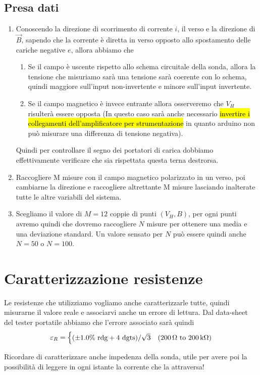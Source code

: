 \documentclass[fleqn,varvw,preprintnumbers,citeautoscript]{memo}
\begin{document}
\subsection{Presa dati}
\begin{enumerate}
    \item Conoscendo la direzione di scorrimento di corrente $i$, il verso e la direzione di $\vec{B}$, sapendo che la corrente è diretta in verso opposto allo spostamento delle cariche negative $e$, allora abbiamo che \begin{enumerate}
        \item Se il campo è uscente rispetto allo schema circuitale della sonda, allora la tensione che misuriamo sarà una tensione sarà coerente con lo schema, quindi maggiore sull'input non-invertente e minore sull'input invertente. 
        \item Se il campo magnetico è invece entrante allora osserveremo che $V_H$ risulterà essere opposta (In questo caso sarà anche necessario \hl{invertire i collegamenti dell'amplificatore per strumentazione} in quanto arduino non può misurare una differenza di tensione negativa). 
    \end{enumerate}
    Quindi per controllare il segno dei portatori di carica dobbiamo effettivamente verificare che sia rispettata questa terna destrorsa. 
    \item Raccogliere M misure con il campo magnetico polarizzato in un verso, poi cambiarne la direzione e raccogliere altrettante M misure lasciando inalterate tutte le altre variabili del sistema. 
    \item Scegliamo il valore di $M=12$ coppie di punti $(V_H,B)$, per ogni punti avremo quindi che dovremo raccogliere $N$ misure per ottenere una media e una deviazione standard. Un valore sensato per $N$ può essere quindi anche $N=50$ o $N=100$. 
\end{enumerate}

\appendix

\section{Caratterizzazione resistenze}

Le resistenze che utilizziamo vogliamo anche caratterizzarle tutte, quindi misurarne il valore reale e associarvi anche un errore di lettura. Dal data-sheet del tester portatile abbiamo che l'errore associato sarà quindi \[\varepsilon_R = \begin{cases}
    \qty(\pm 1.0\% ~\text{rdg} + 4~\text{dgts})/\sqrt{3} & (\text{\SI{200}{\ohm} to \SI{200}{\kilo\ohm}})\\
\end{cases}\] 

\begin{leftbar}
    \noindent Ricordare di caratterizzare anche impedenza della sonda, utile per avere poi la possibilità di leggere in ogni istante la corrente che la attraversa!
\end{leftbar}
\end{document}
